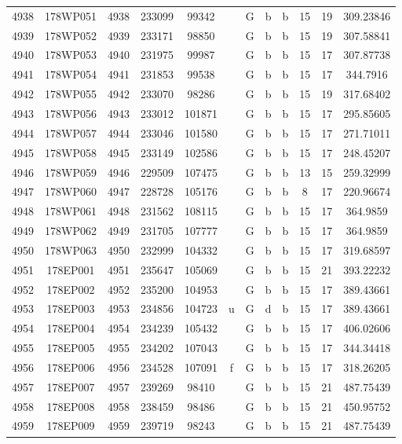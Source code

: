 \begin{tabular}{|*{12}{c|}}
4938 & 178WP051 & 4938 & 233099 & 99342 &  & G & b & b & 15 & 19 & 309.23846 \\ 
4939 & 178WP052 & 4939 & 233171 & 98850 &  & G & b & b & 15 & 19 & 307.58841 \\ 
4940 & 178WP053 & 4940 & 231975 & 99987 &  & G & b & b & 15 & 17 & 307.87738 \\ 
4941 & 178WP054 & 4941 & 231853 & 99538 &  & G & b & b & 15 & 17 & 344.7916 \\ 
4942 & 178WP055 & 4942 & 233070 & 98286 &  & G & b & b & 15 & 19 & 317.68402 \\ 
4943 & 178WP056 & 4943 & 233012 & 101871 &  & G & b & b & 15 & 17 & 295.85605 \\ 
4944 & 178WP057 & 4944 & 233046 & 101580 &  & G & b & b & 15 & 17 & 271.71011 \\ 
4945 & 178WP058 & 4945 & 233149 & 102586 &  & G & b & b & 15 & 17 & 248.45207 \\ 
4946 & 178WP059 & 4946 & 229509 & 107475 &  & G & b & b & 13 & 15 & 259.32999 \\ 
4947 & 178WP060 & 4947 & 228728 & 105176 &  & G & b & b & 8 & 17 & 220.96674 \\ 
4948 & 178WP061 & 4948 & 231562 & 108115 &  & G & b & b & 15 & 17 & 364.9859 \\ 
4949 & 178WP062 & 4949 & 231705 & 107777 &  & G & b & b & 15 & 17 & 364.9859 \\ 
4950 & 178WP063 & 4950 & 232999 & 104332 &  & G & b & b & 15 & 17 & 319.68597 \\ 
4951 & 178EP001 & 4951 & 235647 & 105069 &  & G & b & b & 15 & 21 & 393.22232 \\ 
4952 & 178EP002 & 4952 & 235200 & 104953 &  & G & b & b & 15 & 17 & 389.43661 \\ 
4953 & 178EP003 & 4953 & 234856 & 104723 & u & G & d & b & 15 & 17 & 389.43661 \\ 
4954 & 178EP004 & 4954 & 234239 & 105432 &  & G & b & b & 15 & 17 & 406.02606 \\ 
4955 & 178EP005 & 4955 & 234202 & 107043 &  & G & b & b & 15 & 17 & 344.34418 \\ 
4956 & 178EP006 & 4956 & 234528 & 107091 & f & G & b & b & 15 & 17 & 318.26205 \\ 
4957 & 178EP007 & 4957 & 239269 & 98410 &  & G & b & b & 15 & 21 & 487.75439 \\ 
4958 & 178EP008 & 4958 & 238459 & 98486 &  & G & b & b & 15 & 21 & 450.95752 \\ 
4959 & 178EP009 & 4959 & 239719 & 98243 &  & G & b & b & 15 & 21 & 487.75439 \\ 

\end{tabular}
